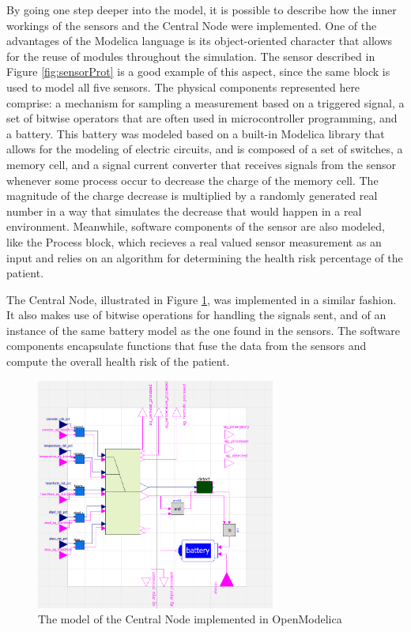By going one step deeper into the model, it is possible to describe how the inner workings of the sensors and the Central Node were implemented. One of the advantages of the Modelica language is its object-oriented character that allows for the reuse of modules throughout the simulation. The sensor described in Figure \ref{fig:sensorProt} is a good example of this aspect, since the same block is used to model all five sensors. The physical components represented here comprise: a mechanism for sampling a measurement based on a triggered signal, a set of bitwise operators that are often used in microcontroller programming, and a battery. This battery was modeled based on a built-in Modelica library that allows for the modeling of electric circuits, and is composed of a set of switches, a memory cell, and a signal current converter that receives signals from the sensor whenever some process occur to decrease the charge of the memory cell. The magnitude of the charge decrease is multiplied by a randomly generated real number in a way that simulates the decrease that would happen in a real environment. Meanwhile, software components of the sensor are also modeled, like the Process block, which recieves a real valued sensor measurement as an input and relies on an algorithm for determining the health risk percentage of the patient.


The Central Node, illustrated in Figure \ref{fig:centralNodeProt}, was implemented in a similar fashion. It also makes use of bitwise operations for handling the signals sent, and of an instance of the same battery model as the one found in the sensors. The software components encapsulate functions that fuse the data from the sensors and compute the overall health risk of the patient.

\begin{figure}[!h]
	\centering
	\includegraphics[width=0.7\textwidth, keepaspectratio]{img/central_node_modelica.png}
	\caption{The model of the Central Node implemented in OpenModelica}
	\label{fig:centralNodeProt}
\end{figure}

